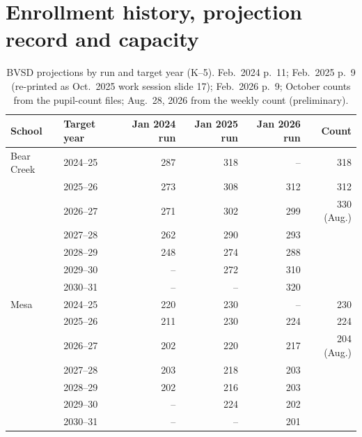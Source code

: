\documentclass[11pt]{article}
\begin{document}
\section{Enrollment history, projection record and capacity}\label{app:history}
\begin{table}[htbp]\centering\small
\caption{BVSD projections by run and target year (K--5). Feb.\ 2024 p.\ 11; Feb.\ 2025 p.\ 9 (re-printed as Oct.\ 2025 work session slide 17); Feb.\ 2026 p.\ 9; October counts from the pupil-count files; Aug.\ 28, 2026 from the weekly count (preliminary).}\label{tab:vint}
\begin{tabular}{llrrrr}
\toprule
School & Target year & Jan 2024 run & Jan 2025 run & Jan 2026 run & Count \\
\midrule
Bear Creek & 2024--25 & 287 & 318 & -- & 318 \\
 & 2025--26 & 273 & 308 & 312 & 312 \\
 & 2026--27 & 271 & 302 & 299 & 330 (Aug.) \\
 & 2027--28 & 262 & 290 & 293 & \\
 & 2028--29 & 248 & 274 & 288 & \\
 & 2029--30 & -- & 272 & 310 & \\
 & 2030--31 & -- & -- & 320 & \\
\midrule
Mesa & 2024--25 & 220 & 230 & -- & 230 \\
 & 2025--26 & 211 & 230 & 224 & 224 \\
 & 2026--27 & 202 & 220 & 217 & 204 (Aug.) \\
 & 2027--28 & 203 & 218 & 203 & \\
 & 2028--29 & 202 & 216 & 203 & \\
 & 2029--30 & -- & 224 & 202 & \\
 & 2030--31 & -- & -- & 201 & \\
\bottomrule
\end{tabular}
\end{table}
\end{document}
